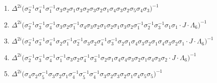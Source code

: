 \vspace{0.3cm}
\begingroup
\raggedbottom %
\begin{enumerate}
    \item $\displaystyle \Delta^{2i} \big( \allowbreak\sigma_{2}^{-1}\allowbreak\sigma_{4}^{-1}\allowbreak\sigma_{1}^{-1}\allowbreak\sigma_{3}\allowbreak\sigma_{2}\allowbreak\sigma_{1}\allowbreak\sigma_{3}\allowbreak\sigma_{2}\allowbreak\sigma_{3}\allowbreak\sigma_{2}\allowbreak\sigma_{1}\allowbreak\sigma_{4}\allowbreak\sigma_{3}\allowbreak\sigma_{2}\allowbreak\sigma_{5}\allowbreak\sigma_{4}\allowbreak\sigma_{3} \big)^{-1}$
    \item $\displaystyle \Delta^{2i} \big( \allowbreak\sigma_{2}^{-1}\allowbreak\sigma_{3}^{-1}\allowbreak\sigma_{4}^{-1}\allowbreak\sigma_{3}\allowbreak\sigma_{2}\allowbreak\sigma_{1}^{-1}\allowbreak\sigma_{4}\allowbreak\sigma_{3}\allowbreak\sigma_{2}\allowbreak\sigma_{1}\allowbreak\sigma_{2}\allowbreak\sigma_{1}\allowbreak\sigma_{3}\allowbreak\sigma_{2}\allowbreak\sigma_{1}^{-1}\allowbreak\sigma_{2}^{-1}\allowbreak\sigma_{3}^{-1}\allowbreak\sigma_{1}\allowbreak\sigma_{1} \cdot J \cdot \Lambda_6 \big)^{-1}$
    \item $\displaystyle \Delta^{2i} \big( \allowbreak\sigma_{2}^{-1}\allowbreak\sigma_{3}^{-1}\allowbreak\sigma_{4}^{-1}\allowbreak\sigma_{2}\allowbreak\sigma_{1}^{-1}\allowbreak\sigma_{2}^{-1}\allowbreak\sigma_{3}\allowbreak\sigma_{2}\allowbreak\sigma_{4}^{-1}\allowbreak\sigma_{3}^{-1}\allowbreak\sigma_{2}\allowbreak\sigma_{1}\allowbreak\sigma_{4}\allowbreak\sigma_{3}\allowbreak\sigma_{2}\allowbreak\sigma_{1}\allowbreak\sigma_{4}\allowbreak\sigma_{3}\allowbreak\sigma_{2}\allowbreak\sigma_{1} \cdot J \cdot \Lambda_6 \big)^{-1}$
    \item $\displaystyle \Delta^{2i} \big( \allowbreak\sigma_{2}^{-1}\allowbreak\sigma_{3}^{-1}\allowbreak\sigma_{4}^{-1}\allowbreak\sigma_{1}^{-1}\allowbreak\sigma_{3}\allowbreak\sigma_{2}\allowbreak\sigma_{4}^{-1}\allowbreak\sigma_{3}^{-1}\allowbreak\sigma_{2}\allowbreak\sigma_{1}\allowbreak\sigma_{4}\allowbreak\sigma_{4}\allowbreak\sigma_{3}\allowbreak\sigma_{2}\allowbreak\sigma_{1}\allowbreak\sigma_{4}\allowbreak\sigma_{3}\allowbreak\sigma_{2} \cdot J \cdot \Lambda_6 \big)^{-1}$
    \item $\displaystyle \Delta^{2i} \big( \allowbreak\sigma_{4}\allowbreak\sigma_{2}\allowbreak\sigma_{5}^{-1}\allowbreak\sigma_{3}\allowbreak\sigma_{2}\allowbreak\sigma_{1}\allowbreak\sigma_{4}^{-1}\allowbreak\sigma_{5}^{-1}\allowbreak\sigma_{4}^{-1}\allowbreak\sigma_{3}\allowbreak\sigma_{2}\allowbreak\sigma_{3}\allowbreak\sigma_{2}\allowbreak\sigma_{1}\allowbreak\sigma_{4}\allowbreak\sigma_{5}\allowbreak\sigma_{5} \big)^{-1}$

\end{enumerate}
